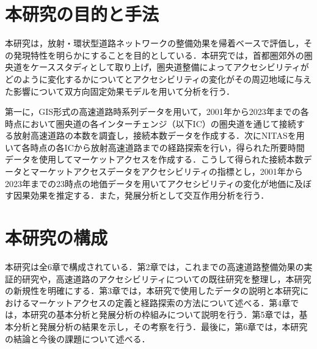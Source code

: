 \section{本研究の目的と手法}

本研究は，放射・環状型道路ネットワークの整備効果を帰着ベースで評価し，その発現特性を明らかにすることを目的としている．本研究では，首都圏郊外の圏央道をケーススタディとして取り上げ，圏央道整備によってアクセシビリティがどのように変化するかについてとアクセシビリティの変化がその周辺地域に与えた影響について双方向固定効果モデルを用いて分析を行う．

第一に，GIS形式の高速道路時系列データを用いて，2001年から2023年までの各時点において圏央道の各インターチェンジ（以下IC）の圏央道を通じて接続する放射高速道路の本数を調査し，接続本数データを作成する．次にNITASを用いて各時点の各ICから放射高速道路までの経路探索を行い，得られた所要時間データを使用してマーケットアクセスを作成する．こうして得られた接続本数データとマーケットアクセスデータをアクセシビリティの指標とし，2001年から2023年までの23時点の地価データを用いてアクセシビリティの変化が地価に及ぼす因果効果を推定する．また，発展分析として交互作用分析を行う．

\section{本研究の構成}

本研究は全6章で構成されている．第2章では，これまでの高速道路整備効果の実証的研究や，高速道路のアクセシビリティについての既往研究を整理し，本研究の新規性を明確にする．第3章では，本研究で使用したデータの説明と本研究におけるマーケットアクセスの定義と経路探索の方法について述べる．第4章では，本研究の基本分析と発展分析の枠組みについて説明を行う．第5章では，基本分析と発展分析の結果を示し，その考察を行う．最後に，第6章では，本研究の結論と今後の課題について述べる．

